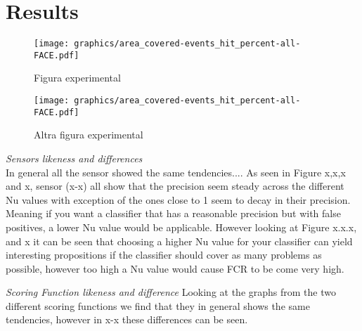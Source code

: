 \section{Results}

\begin{figure}[h!]
  \begin{minipage}[t]{0.5\textwidth}
    \texttt{[image: graphics/area\_covered-events\_hit\_percent-all-FACE.pdf]}
    \caption{Figura experimental}
    \label{fase1}
  \end{minipage}
  \hspace*{\fill} %
  \begin{minipage}[t]{0.5\textwidth}
    \texttt{[image: graphics/area\_covered-events\_hit\_percent-all-FACE.pdf]}
    \caption{Altra figura experimental}
    \label{fase2}
  \end{minipage}
\end{figure}

\textit{Sensors likeness and differences}\\
In general all the sensor showed the same tendencies....
As seen in Figure x,x,x and x, sensor (x-x) all show that the precision seem steady across the different Nu values with exception of the ones close to 1 seem to decay in their precision. Meaning if you want a classifier that has a reasonable precision but with false positives, a lower Nu value would be applicable.
However looking at Figure x.x.x, and x it can be seen that choosing a higher Nu value for your classifier can yield interesting propositions if the classifier should cover as many problems as possible, however too high a Nu value would cause FCR to be come very high.


\textit{Scoring Function likeness and difference}
Looking at the graphs from the two different scoring functions we find that they in general shows the same tendencies, however in x-x these differences can be seen. 
